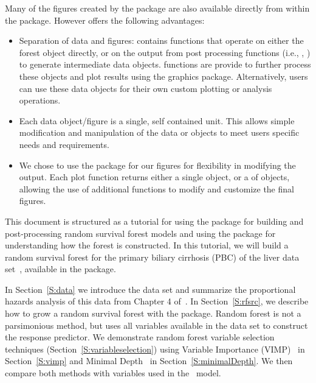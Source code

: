 \documentclass[nojss]{jss}
\begin{document}
Many of the figures created by the  package are also available directly from within the  package. However  offers the following advantages:
\begin{itemize}
\item Separation of data and figures:  contains functions that  operate on either the  forest object directly, or on the output from  post processing functions (i.e., , ) to generate intermediate  data objects.  functions are provide to further process these objects and plot results using the  graphics package. Alternatively, users can use these data objects for their own custom plotting or analysis operations.

\item Each data object/figure is a single, self contained unit. This allows simple modification and manipulation of the data or  objects to meet users specific needs and requirements.

\item We chose to use the  package for our figures for flexibility in modifying the output. Each  plot function returns either a single  object, or a  of  objects, allowing the use of additional  functions to modify and customize the final figures.
\end{itemize}

This document is structured as a tutorial for using the  package for building and post-processing random survival forest models  and using the  package for understanding how the forest is constructed. In this tutorial, we will build a random survival forest for the primary biliary cirrhosis (PBC) of the liver data set~\citep{fleming:1991}, available in the  package.

In Section~\ref{S:data} we introduce the  data set and summarize the proportional hazards analysis of this data from Chapter 4 of~\cite{fleming:1991}. In Section~\ref{S:rfsrc}, we describe how to grow a random survival forest with the  package. Random forest is not a parsimonious method, but uses all variables available in the data set to construct the response predictor. We demonstrate random forest variable selection techniques (Section~\ref{S:variableselection}) using Variable Importance (VIMP)~\citep{Breiman:2001} in Section~\ref{S:vimp} and Minimal Depth~\citep{Ishwaran:2010} in Section~\ref{S:minimalDepth}. We then compare both methods with variables used in the~\cite{fleming:1991} model.
\end{document}
